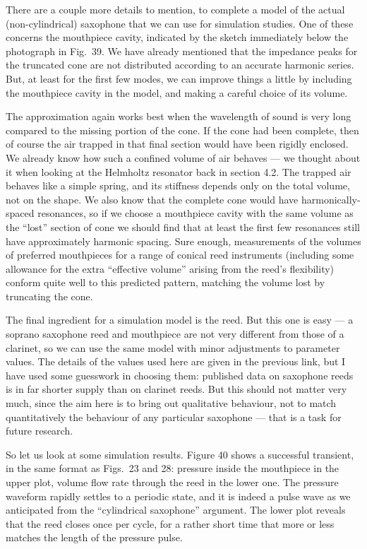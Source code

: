   There are a couple more details to mention, to complete a model of the actual 
  (non-cylindrical) saxophone that we can use for simulation studies. One of 
  these concerns the mouthpiece cavity, indicated by the sketch immediately 
  below the photograph in Fig.\ 39. We have already mentioned that the 
  impedance peaks for the truncated cone are not distributed according to an 
  accurate harmonic series. But, at least for the first few modes, we can 
  improve things a little by including the mouthpiece cavity in the model, and 
  making a careful choice of its volume. 

  The approximation again works best when the wavelength of sound is very long 
  compared to the missing portion of the cone. If the cone had been complete, 
  then of course the air trapped in that final section would have been rigidly 
  enclosed. We already know how such a confined volume of air behaves — we 
  thought about it when looking at the Helmholtz resonator back in section 4.2. 
  The trapped air behaves like a simple spring, and its stiffness depends only 
  on the total volume, not on the shape. We also know that the complete cone 
  would have harmonically-spaced resonances, so if we choose a mouthpiece 
  cavity with the same volume as the “lost” section of cone we should find that 
  at least the first few resonances still have approximately harmonic spacing. 
  Sure enough, measurements of the volumes of preferred mouthpieces for a range 
  of conical reed instruments (including some allowance for the extra 
  ``effective volume'' arising from the reed's flexibility) conform quite well 
  to this predicted pattern, matching the volume lost by truncating the cone. 

  The final ingredient for a simulation model is the reed. But this one is easy 
  — a soprano saxophone reed and mouthpiece are not very different from those 
  of a clarinet, so we can use the same model with minor adjustments to 
  parameter values. The details of the values used here are given in the 
  previous link, but I have used some guesswork in choosing them: published 
  data on saxophone reeds is in far shorter supply than on clarinet reeds. But 
  this should not matter very much, since the aim here is to bring out 
  qualitative behaviour, not to match quantitatively the behaviour of any 
  particular saxophone — that is a task for future research. 

  So let us look at some simulation results. Figure 40 shows a successful 
  transient, in the same format as Figs.\ 23 and 28: pressure inside the 
  mouthpiece in the upper plot, volume flow rate through the reed in the lower 
  one. The pressure waveform rapidly settles to a periodic state, and it is 
  indeed a pulse wave as we anticipated from the “cylindrical saxophone” 
  argument. The lower plot reveals that the reed closes once per cycle, for a 
  rather short time that more or less matches the length of the pressure pulse. 

